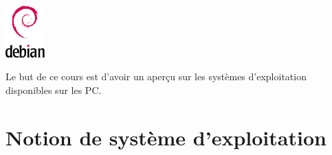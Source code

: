 \documentclass[11pt,oneside]{article}
\begin{document}
\begin{minipage}[c]{.15\linewidth}
\begin{center}
\includegraphics[height=2cm]{png/debian}
\end{center}
\end{minipage}




\vspace{.5cm}


%
%
%

\begin{savoir}
Le but de ce cours est d'avoir un aperçu sur les systèmes d'exploitation disponibles sur les PC.
\end{savoir}


\setlength{\parskip}{0ex plus 0.2ex minus 0ex}
 \renewcommand{\contentsname}{}
 \renewcommand{\baselinestretch}{1}

\tableofcontents

 \renewcommand{\baselinestretch}{1.2}
\setlength{\parskip}{2ex plus 0.5ex minus 0.2ex}


\section{Notion de système d'exploitation}
\end{document}
